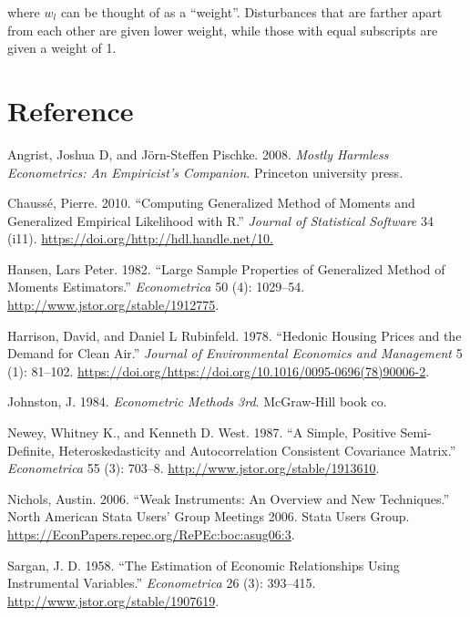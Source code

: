 \documentclass[
  12pt,
]{article}
\newlength{\cslhangindent}
\newenvironment{cslreferences}%
  {\setlength{\parindent}{0pt}%
  \everypar{\setlength{\hangindent}{\cslhangindent}}\ignorespaces}%
  {\par}
\begin{document}
where \(w_l\) can be thought of as a ``weight''. Disturbances that are farther apart from each other are given lower weight, while those with equal subscripts are given a weight of 1.

\hypertarget{reference}{%
\section{Reference}\label{reference}}

\hypertarget{refs}{}
\begin{cslreferences}
\leavevmode\hypertarget{ref-angrist2008mostly}{}%
Angrist, Joshua D, and Jörn-Steffen Pischke. 2008. \emph{Mostly Harmless Econometrics: An Empiricist's Companion}. Princeton university press.

\leavevmode\hypertarget{ref-gmmR}{}%
Chaussé, Pierre. 2010. ``Computing Generalized Method of Moments and Generalized Empirical Likelihood with R.'' \emph{Journal of Statistical Software} 34 (i11). \url{https://doi.org/http://hdl.handle.net/10.}

\leavevmode\hypertarget{ref-Hansen1982}{}%
Hansen, Lars Peter. 1982. ``Large Sample Properties of Generalized Method of Moments Estimators.'' \emph{Econometrica} 50 (4): 1029--54. \url{http://www.jstor.org/stable/1912775}.

\leavevmode\hypertarget{ref-Boston}{}%
Harrison, David, and Daniel L Rubinfeld. 1978. ``Hedonic Housing Prices and the Demand for Clean Air.'' \emph{Journal of Environmental Economics and Management} 5 (1): 81--102. \url{https://doi.org/https://doi.org/10.1016/0095-0696(78)90006-2}.

\leavevmode\hypertarget{ref-johnston1984econometric}{}%
Johnston, J. 1984. \emph{Econometric Methods 3rd}. McGraw-Hill book co.

\leavevmode\hypertarget{ref-NWe}{}%
Newey, Whitney K., and Kenneth D. West. 1987. ``A Simple, Positive Semi-Definite, Heteroskedasticity and Autocorrelation Consistent Covariance Matrix.'' \emph{Econometrica} 55 (3): 703--8. \url{http://www.jstor.org/stable/1913610}.

\leavevmode\hypertarget{ref-WeakIV}{}%
Nichols, Austin. 2006. ``Weak Instruments: An Overview and New Techniques.'' North American Stata Users' Group Meetings 2006. Stata Users Group. \url{https://EconPapers.repec.org/RePEc:boc:asug06:3}.

\leavevmode\hypertarget{ref-Sargan1958}{}%
Sargan, J. D. 1958. ``The Estimation of Economic Relationships Using Instrumental Variables.'' \emph{Econometrica} 26 (3): 393--415. \url{http://www.jstor.org/stable/1907619}.


\end{cslreferences}
\end{document}
